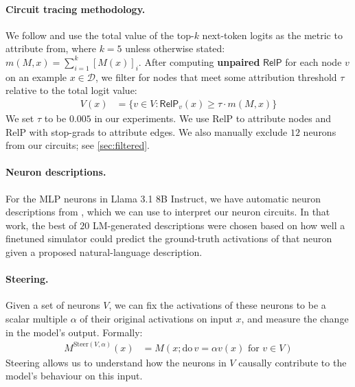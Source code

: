 \documentclass{article}
\theoremstyle{plain}
\theoremstyle{definition}
\theoremstyle{remark}
\begin{document}
\paragraph{Circuit tracing methodology.}
We follow \citet{ameisen2025circuit} and use the total value of the top-$k$ next-token logits as the metric to attribute from, where $k=5$ unless otherwise stated: $m(M, x) = \sum_{i=1}^k{\left[M(x)\right]_i}$.
After computing \textbf{unpaired} $\mathsf{RelP}$ for each node $v$ on an example $x \in \mathcal{D}$, we filter for nodes that meet some attribution threshold $\tau$ relative to the total logit value:
\begin{align}
V(x) &= \{v \in V : \mathsf{RelP}_v(x) \geq \tau \cdot m(M, x)\}
\end{align}
We set $\tau$ to be $0.005$ in our experiments. We use RelP to attribute nodes and RelP with stop-grads to attribute edges. We also manually exclude $12$ neurons from our circuits; see \cref{sec:filtered}.


\paragraph{Neuron descriptions.} For the MLP neurons in Llama 3.1 8B Instruct, we have automatic neuron descriptions from \citet{choi2024automatic}, which we can use to interpret our neuron circuits. In that work, the best of $20$ LM-generated descriptions were chosen based on how well a finetuned simulator could predict the ground-truth activations of that neuron given a proposed natural-language description.

\paragraph{Steering.} Given a set of neurons $V$, we can fix the activations of these neurons to be a scalar multiple $\alpha$ of their original activations on input $x$, and measure the change in the model's output. Formally:
\begin{align}
M^{\text{Steer}(V, \alpha)}(x) &= M(x; \text{do}\,v = \alpha{}v(x) \text{ for } v \in V)
\end{align}
Steering allows us to understand how the neurons in $V$ causally contribute to the model's behaviour on this input.
\end{document}
